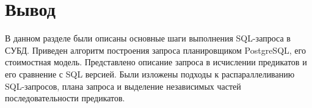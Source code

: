 \section*{Вывод}
\vspace{-0.5cm}
В данном разделе были описаны основные шаги выполнения SQL-запроса в СУБД. Приведен алгоритм построения запроса планировщиком PostgreSQL, его стоимостная модель. Представлено описание запроса в исчислении предикатов и его сравнение с SQL версией. Были изложены подходы к распараллеливанию SQL-запросов, плана запроса и выделение независимых частей последовательности предикатов.